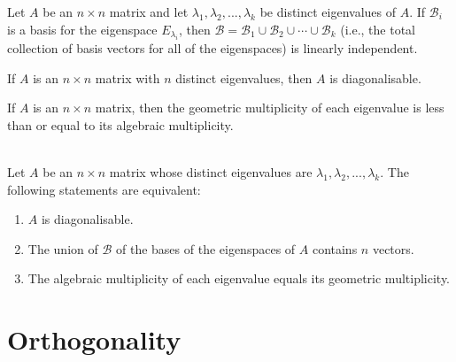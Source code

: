 \documentclass{article}
\begin{document}
\begin{theorem}
    Let $A$ be an $n\times n$ matrix and let $\lambda_1, \lambda_2, ..., \lambda_k$ be distinct eigenvalues of $A$. If $\mathcal{B}_i$ is a basis for the eigenspace $E_{\lambda_i}$, then $\mathcal{B} = \mathcal{B}_1\cup\mathcal{B}_2\cup\cdots\cup\mathcal{B}_k$ (i.e., the total collection of basis vectors for all of the eigenspaces) is linearly independent.
\end{theorem}
\begin{theorem}
    If $A$ is an $n\times n$ matrix with $n$ distinct eigenvalues, then $A$ is diagonalisable.
\end{theorem}
\begin{theorem}
    If $A$ is an $n\times n$ matrix, then the geometric multiplicity of each eigenvalue is less than or equal to its algebraic multiplicity.
\end{theorem}
\begin{theorem}
    \\
    Let $A$ be an $n\times n$ matrix whose distinct eigenvalues are $\lambda_1, \lambda_2, ...,\lambda_k$. The following statements are equivalent:
    \begin{enumerate}
        \item $A$ is diagonalisable.
        \item The union of $\mathcal{B}$ of the bases of the eigenspaces of $A$ contains $n$ vectors.
        \item The algebraic multiplicity of each eigenvalue equals its geometric multiplicity.
    \end{enumerate}

\end{theorem}
\section{Orthogonality}
\end{document}
